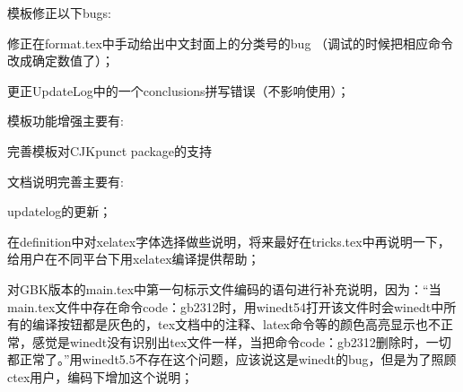 模板修正以下bugs:
\begin{hitlist}
\item 修正在format.tex中手动给出中文封面上的分类号的bug （调试的时候把相应命令改成确定数值了）；
\item 更正UpdateLog中的一个conclusions拼写错误（不影响使用）；
\end{hitlist}

模板功能增强主要有:
\begin{hitlist}
\item 完善模板对CJKpunct package的支持
\end{hitlist}
文档说明完善主要有:
\begin{hitlist}
\item updatelog的更新；
\item 在definition中对xelatex字体选择做些说明，将来最好在tricks.tex中再说明一下，给用户在不同平台下用xelatex编译提供帮助；
\item 对GBK版本的main.tex中第一句标示文件编码的语句进行补充说明，因为：“当main.tex文件中存在命令code：gb2312时，用winedt54打开该文件时会winedt中所有的编译按钮都是灰色的，tex文档中的注释、latex命令等的颜色高亮显示也不正常，感觉是winedt没有识别出tex文件一样，当把命令code：gb2312删除时，一切都正常了。”用winedt5.5不存在这个问题，应该说这是winedt的bug，但是为了照顾ctex用户，编码下增加这个说明；
\end{hitlist}
